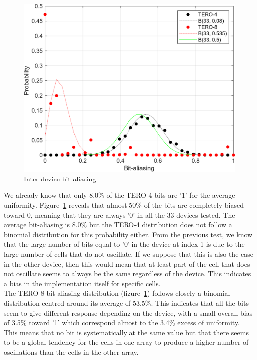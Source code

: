 \begin{figure}[H]
    \centering \includegraphics[width=0.8\linewidth]{images/tero_inter_aliasing.png}
    \caption{Inter-device bit-aliasing}
    \label{fig:tero_inter_aliasing}
\end{figure}

We already know that only 8.0\% of the TERO-4 bits are '1' for the average uniformity. Figure~\ref{fig:tero_inter_aliasing} reveals that almost 50\% of the bits are completely biased toward 0, meaning that they are always '0' in all the 33 devices tested. The average bit-aliasing is 8.0\% but the TERO-4 distribution does not follow a binomial distribution for this probability either. From the previous test, we know that the large number of bits equal to '0' in the device at index 1 is due to the large number of cells that do not oscillate. If we suppose that this is also the case in the other device, then this would mean that at least part of the cell that does not oscillate seems to always be the same regardless of the device. This indicates a bias in the implementation itself for specific cells.\\



The TERO-8 bit-aliasing distribution (figure~\ref{fig:tero_inter_aliasing}) follows closely a binomial distribution centred around its average of 53.5\%. This indicates that all the bits seem to give different response depending on the device, with a small overall bias of 3.5\% toward '1' which correspond almost to the 3.4\% excess of uniformity. This means that no bit is systematically at the same value but that there seems to be a global tendency for the cells in one array to produce a higher number of oscillations than the cells in the other array.



